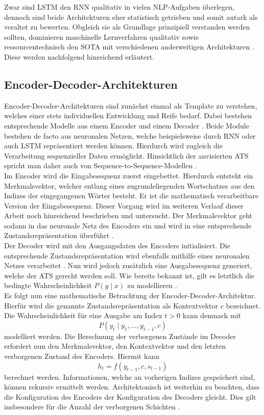 \noindent
Zwar sind \ac{LSTM} den \ac{RNN} qualitativ in vielen \ac{NLP}-Aufgaben überlegen, dennoch sind beide Architekturen eher statistisch getrieben und somit autark als veraltet zu bewerten. Obgleich sie als Grundlage prinzipiell verstanden werden sollten, dominieren maschinelle Lernverfahren qualitativ sowie ressourcentechnisch den \ac{SOTA} mit verschiedenen anderweitigen Architekturen \cite{CUR18}. Diese werden nachfolgend hinreichend erläutert.


\subsection{Encoder-Decoder-Architekturen}
\noindent
Encoder-Decoder-Architekturen sind zunächst einmal als Template zu verstehen, welches einer stets individuellen Entwicklung und Reife bedarf. Dabei bestehen entsprechende Modelle aus einem Encoder und einem Decoder \cite[S.~375-376]{ZHA20}. Beide Module bestehen de facto aus neuronalen Netzen, welche beispielsweise durch \ac{RNN} oder auch \ac{LSTM} repräsentiert werden können. Hierdurch wird zugleich die Verarbeitung sequenzieller Daten ermöglicht. Hinsichtlich der anvisierten \ac{ATS} spricht man daher auch von Sequence-to-Sequence-Modellen \cite[S.~377]{ZHA20}.\\

\noindent
Im Encoder wird die Eingabesequenz zuerst eingebettet. Hierdurch entsteht ein Merkmalsvektor, welcher entlang eines zugrundeliegenden Wortschatzes aus den Indizes der eingegangenen Wörter besteht. Er ist die mathematisch verarbeitbare Version der Eingabesequenz. Dieser Vorgang wird im weiteren Verlauf dieser Arbeit noch hinreichend beschrieben und untersucht. Der Merkmalsvektor geht sodann in das neuronale Netz des Encoders ein und wird in eine entsprechende Zustandsrepräsentation überführt \cite{YAN19}.\\

\noindent
Der Decoder wird mit den Ausgangsdaten des Encoders initialisiert. Die entsprechende Zustandsrepräsentation wird ebenfalls mithilfe eines neuronalen Netzes verarbeitet \cite[S.379]{ZHA20}. Nun wird jedoch zusätzlich eine Ausgabesequenz generiert, welche der \ac{ATS} gerecht werden soll. Wie bereits bekannt ist, gilt es letztlich die bedingte Wahrscheinlichkeit $P(y \mid x)$ zu modellieren \cite{YAN19}.\\

\noindent
Es folgt nun eine mathematische Betrachtung der Encoder-Decoder-Architektur. Hierfür wird die genannte Zustandsrepräsentation als Kontextvektor $c$ bezeichnet. Die Wahrscheinlichkeit für eine Ausgabe am Index $t > 0$ kann demnach mit $$P(y_t \mid y_1, ..., y_{t-1}, c)$$ modelliert werden. Die Berechnung der verborgenen Zustände im Decoder erfordert nun den Merkmalsvektor, den Kontextvektor und den letzten verborgenen Zustand des Encoders. Hiermit kann $$h_t = f(y_{t-1}, c, s_{t-1})$$ berechnet werden. Informationen, welche an vorherigen Indizes gespeichert sind, können rekursiv ermittelt werden. Architektonisch ist weiterhin zu beachten, dass die Konfiguration des Encoders der Konfiguration des Decoders gleicht. Dies gilt insbesondere für die Anzahl der verborgenen Schichten \cite[S.~379]{ZHA20}.\\

